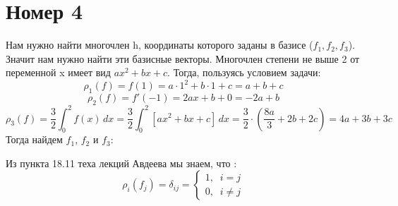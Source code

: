 \documentclass[a4paper,12pt]{article}
\begin{document}
\section*{Номер 4}
Нам нужно найти многочлен h, координаты которого заданы в базисе ($f_1, f_2, f_3$). Значит нам нужно найти эти базисные векторы. Многочлен степени не выше 2 от переменной x имеет вид $ax^2 + bx + c$. Тогда, пользуясь условием задачи:
\[
\rho_1(f) = f(1) = a \cdot 1^2 + b \cdot 1  + c = a + b + c
\]
\[
\rho_2(f) = f'(-1) = 2ax + b + 0 = -2a + b
\]
\[
\rho_3(f) = \frac{3}{2} \int_{0}^{2} f(x) \, dx = \frac{3}{2} \int_{0}^{2} \left[ ax^2 + bx + c \right] \, dx = \frac{3}{2} \cdot \left( \frac{8a}{3} + 2b + 2c \right) = 4a + 3b + 3c
\]
Тогда найдем $f_1$, $f_2$ и $f_3$:

Из пункта 18.11 теха лекций Авдеева мы знаем, что :
\[
\rho_i(f_j) = \delta_{ij} = \begin{cases}
1, \; \; i = j \\
0, \; \; i \neq j
\end{cases}
\]
\end{document}
